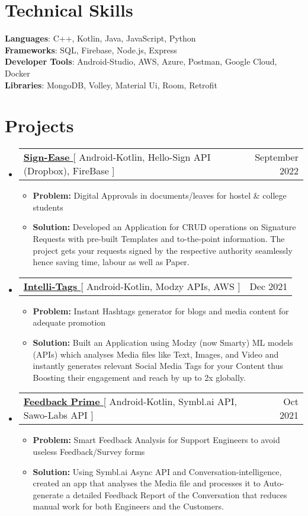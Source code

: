 \documentclass[letterpaper,11pt]{article}
\makeatletter
\newcommand{\resumeItem}[1]{
  \item\small{
    {#1 \vspace{-2pt}}
  }
}
\newcommand{\resumeProjectHeading}[2]{
    \item
    \begin{tabular*}{0.97\textwidth}{l@{\extracolsep{\fill}}r}
      \small#1 & #2 \\
    \end{tabular*}\vspace{-7pt}
}
\newcommand{\resumeSubHeadingListStart}{\begin{itemize}[leftmargin=0.15in, label={}]}
\newcommand{\resumeSubHeadingListEnd}{\end{itemize}}
\newcommand{\resumeItemListStart}{\begin{itemize}}
\newcommand{\resumeItemListEnd}{\end{itemize}\vspace{-5pt}}
\makeatother
\begin{document}
\section{Technical Skills}
 \begin{itemize}[leftmargin=0.15in, label={}]
    \small{\item{
     \textbf{Languages}{: C++, Kotlin, Java, JavaScript, Python} \\
     \textbf{Frameworks}{: SQL, Firebase, Node.js, Express  } \\
     \textbf{Developer Tools}{: Android-Studio, AWS, Azure, Postman, Google Cloud, Docker } \\
     \textbf{Libraries}{: MongoDB, Volley, Material Ui, Room, Retrofit  }
    }}
 \end{itemize}
\section{Projects}

 \resumeSubHeadingListStart
      \resumeProjectHeading
          {\textbf{\href{https://github.com/itsnitish22/Sign-Ease}{Sign-Ease }}{[ Android-Kotlin, Hello-Sign API (Dropbox), FireBase ]}}{September 2022}
          \resumeItemListStart
          \resumeItem{\textbf{Problem:} Digital Approvals in documents/leaves for hostel \& college students}
          \resumeItem{\textbf{Solution:} Developed an Application for CRUD operations on Signature Requests with pre-built Templates and to-the-point information. The project gets your requests signed by the respective authority seamlessly hence saving time, labour as well as Paper.}
          \resumeItemListEnd
    \resumeSubHeadingListEnd
    
 \resumeSubHeadingListStart
      \resumeProjectHeading
          {\textbf{\href{https://github.com/aniketk13/Intelli-Tags}{Intelli-Tags }}{[ Android-Kotlin, Modzy APIs, AWS ]}}{Dec 2021}
          \resumeItemListStart
          \resumeItem{\textbf{Problem:} Instant Hashtags generator for blogs and media content for adequate promotion}
          \resumeItem{\textbf{Solution:} Built an Application using Modzy (now Smarty) ML models (APIs) which analyses Media files like Text, Images, and Video and instantly generates relevant Social Media Tags for your Content thus Boosting their engagement and reach by up to 2x globally.}
          \resumeItemListEnd
    \resumeSubHeadingListEnd
    
    \resumeSubHeadingListStart
      \resumeProjectHeading
          {\textbf{\href{https://github.com/aniketk13/Feedback-Prime}{Feedback Prime }}{[ Android-Kotlin, Symbl.ai API, Sawo-Labs API ]}}{Oct 2021}
          \resumeItemListStart
           \resumeItem{\textbf{Problem:} Smart Feedback Analysis for Support Engineers to avoid useless Feedback/Survey forms}
           \resumeItem{\textbf{Solution:} Using Symbl.ai Async API and Conversation-intelligence, created an app that analyses the Media file and processes it to Auto-generate a detailed Feedback Report of the Conversation that reduces manual work for both Engineers and the Customers.}
          \resumeItemListEnd
    \resumeSubHeadingListEnd
    
\end{document}
